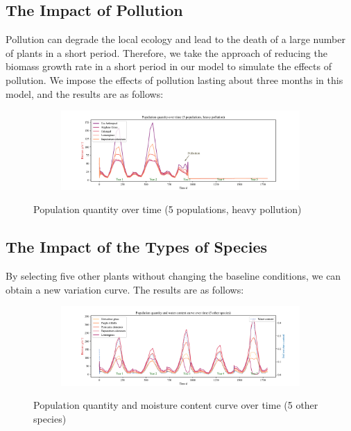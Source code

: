\documentclass{mcmthesis}
\begin{document}
\subsection{The Impact of Pollution}

\indent

Pollution can degrade the local ecology and lead to the death of a large number of plants in a short period. Therefore, we take the approach of reducing the biomass growth rate in a short period in our model to simulate the effects of pollution. We impose the effects of pollution lasting about three months in this model, and the results are as follows:

\begin{figure}[h]
\centering 
\begin{subfigure}{ \textwidth}
\includegraphics[width=\textwidth]{img/pollution.pdf}
\end{subfigure}
\caption{Population quantity over time (5 populations, heavy pollution)}
\label{fig:pollution}
\end{figure}

\subsection{The Impact of the Types of Species}

\indent

By selecting five other plants without changing the baseline conditions, we can obtain a new variation curve. The results are as follows:

\begin{figure}[h]
\centering 
\begin{subfigure}{ \textwidth}
\includegraphics[width=\textwidth]{img/other_5_2_85.pdf}
\end{subfigure}
\caption{Population quantity and moisture content curve over time (5 other species)}
\label{fig:other_5_2_85}
\end{figure}
\end{document}
